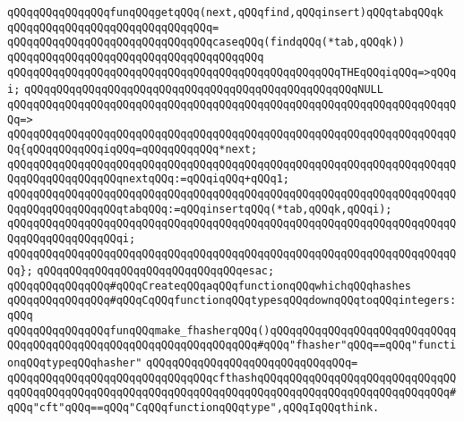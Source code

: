 \verb|qQQqqQQqqQQqqQQqfunqQQqgetqQQq(next,qQQqfind,qQQqinsert)qQQqtabqQQqk|\newline
\verb|qQQqqQQqqQQqqQQqqQQqqQQqqQQqqQQq=|\newline
\verb|qQQqqQQqqQQqqQQqqQQqqQQqqQQqqQQqcaseqQQq(findqQQq(*tab,qQQqk))|\newline
\verb|qQQqqQQqqQQqqQQqqQQqqQQqqQQqqQQqqQQqqQQq|\newline
\verb|qQQqqQQqqQQqqQQqqQQqqQQqqQQqqQQqqQQqqQQqqQQqqQQqqQQqTHEqQQqiqQQq=>qQQqi;|\newline
\newline
\verb|qQQqqQQqqQQqqQQqqQQqqQQqqQQqqQQqqQQqqQQqqQQqqQQqqQQqNULL|\newline
\verb|qQQqqQQqqQQqqQQqqQQqqQQqqQQqqQQqqQQqqQQqqQQqqQQqqQQqqQQqqQQqqQQqqQQqqQQq=>|\newline
\verb|qQQqqQQqqQQqqQQqqQQqqQQqqQQqqQQqqQQqqQQqqQQqqQQqqQQqqQQqqQQqqQQqqQQqqQQq{qQQqqQQqqQQqiqQQq=qQQqqQQqqQQq*next;|\newline
\verb|qQQqqQQqqQQqqQQqqQQqqQQqqQQqqQQqqQQqqQQqqQQqqQQqqQQqqQQqqQQqqQQqqQQqqQQqqQQqqQQqqQQqqQQqnextqQQq:=qQQqiqQQq+qQQq1;|\newline
\verb|qQQqqQQqqQQqqQQqqQQqqQQqqQQqqQQqqQQqqQQqqQQqqQQqqQQqqQQqqQQqqQQqqQQqqQQqqQQqqQQqqQQqqQQqtabqQQq:=qQQqinsertqQQq(*tab,qQQqk,qQQqi);|\newline
\verb|qQQqqQQqqQQqqQQqqQQqqQQqqQQqqQQqqQQqqQQqqQQqqQQqqQQqqQQqqQQqqQQqqQQqqQQqqQQqqQQqqQQqqQQqi;|\newline
\verb|qQQqqQQqqQQqqQQqqQQqqQQqqQQqqQQqqQQqqQQqqQQqqQQqqQQqqQQqqQQqqQQqqQQqqQQq};|\newline
\verb|qQQqqQQqqQQqqQQqqQQqqQQqqQQqqQQqesac;|\newline
\newline
\newline
\newline
\verb|qQQqqQQqqQQqqQQq#qQQqCreateqQQqaqQQqfunctionqQQqwhichqQQqhashes|\newline
\verb|qQQqqQQqqQQqqQQq#qQQqCqQQqfunctionqQQqtypesqQQqdownqQQqtoqQQqintegers:qQQq|\newline
\newline
\verb|qQQqqQQqqQQqqQQqfunqQQqmake_fhasherqQQq()qQQqqQQqqQQqqQQqqQQqqQQqqQQqqQQqqQQqqQQqqQQqqQQqqQQqqQQqqQQqqQQqqQQq#qQQq"fhasher"qQQq==qQQq"functionqQQqtypeqQQqhasher"|\newline
\verb|qQQqqQQqqQQqqQQqqQQqqQQqqQQqqQQq=|\newline
\verb|qQQqqQQqqQQqqQQqqQQqqQQqqQQqqQQqcfthashqQQqqQQqqQQqqQQqqQQqqQQqqQQqqQQqqQQqqQQqqQQqqQQqqQQqqQQqqQQqqQQqqQQqqQQqqQQqqQQqqQQqqQQqqQQqqQQqqQQq#qQQq"cft"qQQq==qQQq"CqQQqfunctionqQQqtype",qQQqIqQQqthink.|\newline
